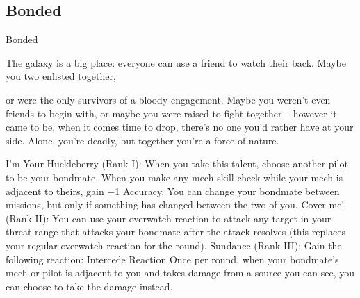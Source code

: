 \subsection{Bonded}


                                                     Bonded

The galaxy is a big place: everyone can use a friend to watch their back. Maybe you two enlisted together,

or were the only survivors of a bloody engagement. Maybe you weren’t even friends to begin with, or
maybe you were raised to fight together  -- however it came to be, when it comes time to drop, there’s no
one you’d rather have at your side. Alone, you’re deadly, but together you’re a force of nature.

I’m Your Huckleberry (Rank I): When you take this talent, choose another pilot to be your
bondmate. When you make any mech skill check while your mech is adjacent to theirs, gain +1
Accuracy. You can change your bondmate between missions, but only if something has changed
between the two of you.
Cover me! (Rank II): You can use your overwatch reaction to attack any target in your threat
range that attacks your bondmate after the attack resolves (this replaces your regular overwatch
reaction for the round).
Sundance (Rank III): Gain the following reaction:
         Intercede
         Reaction
         Once per round, when your bondmate’s mech or pilot is adjacent to you and takes
         damage from a source you can see, you can choose to take the damage instead.